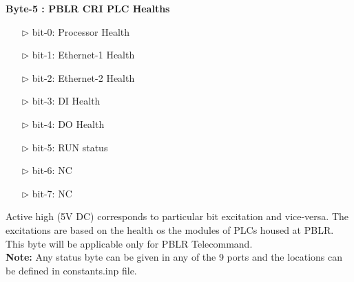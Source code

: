 \textbf{Byte-5 : PBLR CRI PLC Healths }
\begin{enumerate}
	\item [$\rhd$] bit-0: Processor Health
	\item [$\rhd$] bit-1: Ethernet-1 Health
	\item [$\rhd$] bit-2: Ethernet-2 Health
	\item [$\rhd$] bit-3: DI Health
	\item [$\rhd$] bit-4: DO Health
	\item [$\rhd$] bit-5: RUN status
	\item [$\rhd$] bit-6: NC
	\item [$\rhd$] bit-7: NC
\end{enumerate}
Active high (5V DC) corresponds to particular bit excitation and vice-versa. The excitations are based on the health os the modules of PLCs housed at PBLR. This byte will be applicable only for PBLR Telecommand.\\

\textbf{Note:} Any status byte can be given in any of the 9 ports and the locations can be defined in constants.inp file.

